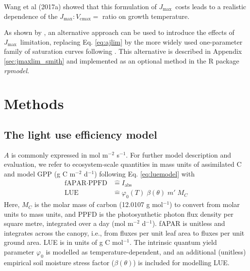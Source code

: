 \documentclass{myreport}
\newcommand{\vcmax}{$V_{\text{cmax}}$}
\newcommand{\jmax}{$J_{\text{max}}$}
\begin{document}
Wang et al (2017a) showed that this formulation of \jmax\ costs leads to a realistic dependence of the \jmax $:$\vcmax $=$ ratio on growth temperature.

As shown by \citet{smith19ecollett}, an alternative approach can be used to introduce the effects of \jmax\ limitation, replacing Eq. \ref{eq:ajlim} by the more widely used one-parameter family of saturation curves following \citet{farquhar84}. This alternative is described in Appendix \ref{sec:jmaxlim_smith} and implemented as an optional method in the R package \textit{rpmodel}.

\section{Methods}
\label{sec:methods}

\subsection{The light use efficiency model}
\label{sec:luemodel}
$A$ is commonly expressed in mol m$^{-2}$ s$^{-1}$. For further model description and evaluation, we refer to ecosystem-scale quantities in mass units of assimilated C and model GPP (g C m$^{-2}$ d$^{-1}$) following Eq. \ref{eq:luemodel}
with 
\begin{align}
    \label{eq:iabs_identification}
    \text{fAPAR} \cdot \text{PPFD} &\mathrel{\widehat{=}} I_{\text{abs}} \\
    \label{eq:lue_identification}
    \text{LUE} &\mathrel{\widehat{=}} \varphi_0(T) \; \beta(\theta) \; m' \; M_C
\end{align}
Here, $M_C$ is the molar mass of carbon (12.0107 g mol$^{-1}$) to convert from molar units to mass units, and PPFD is the photosynthetic photon flux density per square metre, integrated over a day (mol m$^{-2}$ d$^{-1}$). fAPAR is unitless and integrates across the canopy, i.e., from fluxes per unit leaf area to fluxes per unit ground area. LUE is in units of g C mol$^{-1}$. The intrinsic quantum yield parameter $\varphi_0$ is modelled as temperature-dependent, and an additional (unitless) empirical soil moisture stress factor ($\beta (\theta)$) is included for modelling LUE.
\end{document}
